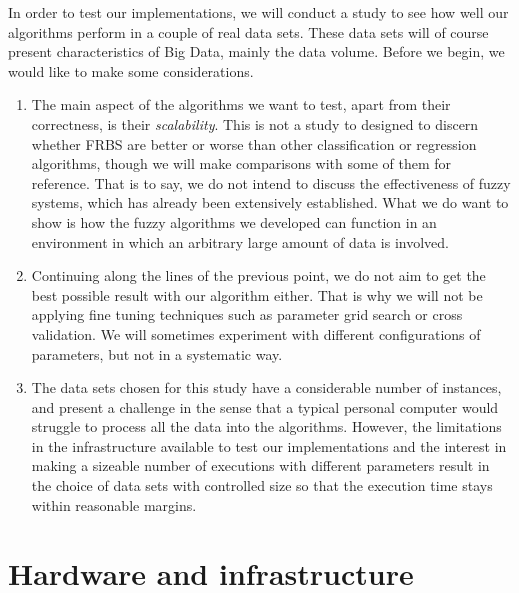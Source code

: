 %
%
%

In order to test our implementations, we will conduct a study to see how well our algorithms perform in a couple of real data sets. These data sets will of course present characteristics of Big Data, mainly the data volume. Before we begin, we would like to make some considerations.

\begin{enumerate}[1.]
  \item The main aspect of the algorithms we want to test, apart from their correctness, is their \textit{scalability}. This is not a study to designed to discern whether FRBS are better or worse than other classification or regression algorithms, though we will make comparisons with some of them for reference. That is to say, we do not intend to discuss the effectiveness of fuzzy systems, which has already been extensively established. What we do want to show is how the fuzzy algorithms we developed can function in an environment in which an arbitrary large amount of data is involved.
  \item Continuing along the lines of the previous point, we do not aim to get the best possible result with our algorithm either. That is why we will not be applying fine tuning techniques such as parameter grid search or cross validation. We will sometimes experiment with different configurations of parameters, but not in a systematic way.
  \item The data sets chosen for this study have a considerable number of instances, and present a challenge in the sense that a typical personal computer would struggle to process all the data into the algorithms. However, the limitations in the infrastructure available to test our implementations and the interest in making a sizeable number of executions with different parameters result in the choice of data sets with controlled size so that the execution time stays within reasonable margins.
\end{enumerate}

\section{Hardware and infrastructure}

